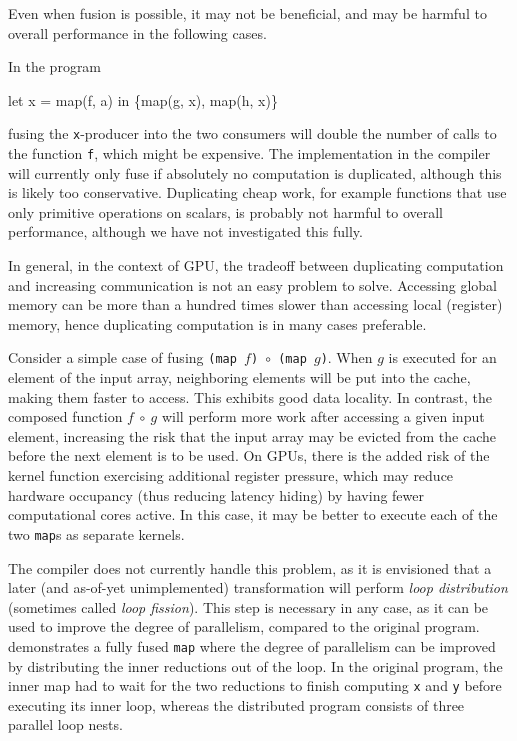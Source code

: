 Even when fusion is possible, it may not be beneficial, and may be
harmful to overall performance in the following cases.

\begin{description}[style=nextline]
\item[Computation may be duplicated.]

In the program
\begin{colorcode}
let x = map(f, a) in
\{map(g, x), map(h, x)\}
\end{colorcode}
fusing the \texttt{x}-producer into the two consumers will double the
number of calls to the function \texttt{f}, which might be expensive.
The implementation in the \LO{} compiler will currently only fuse if
absolutely no computation is duplicated, although this is likely too
conservative.  Duplicating cheap work, for example functions that use
only primitive operations on scalars, is probably not harmful to
overall performance, although we have not investigated this
fully.

In general, in the context of GPU, the tradeoff between duplicating
computation and increasing communication is not an easy problem to
solve.  Accessing global memory can be more than a hundred times
slower than accessing local (register) memory, hence duplicating
computation is in many cases preferable.

\item[Can reduce memory locality.]

  Consider a simple case of fusing
  \texttt{(map~$f$)~$\circ$~(map~$g$)}.  When $g$ is executed for an
  element of the input array, neighboring elements will be put into
  the cache, making them faster to access.  This exhibits good data
  locality.  In contrast, the composed function $f~\circ~g$ will
  perform more work after accessing a given input element, increasing
  the risk that the input array may be evicted from the cache before
  the next element is to be used.  On GPUs, there is the added risk of
  the kernel function exercising additional register pressure, which
  may reduce hardware occupancy (thus reducing latency hiding) by
  having fewer computational cores active.  In this case, it may be
  better to execute each of the two \texttt{map}s as separate kernels.

  The \LO{} compiler does not currently handle this problem, as it is
  envisioned that a later (and as-of-yet unimplemented) transformation
  will perform \textit{loop distribution} (sometimes called
  \textit{loop fission}).  This step is necessary in any case, as it
  can be used to improve the degree of parallelism, compared to the
  original program.   demonstrates a fully
  fused \texttt{map} where the degree of parallelism can be improved
  by distributing the inner reductions out of the loop.  In the
  original program, the inner map had to wait for the two reductions
  to finish computing \texttt{x} and \texttt{y} before executing its
  inner loop, whereas the distributed program consists of three
  parallel loop nests.
\end{description}

